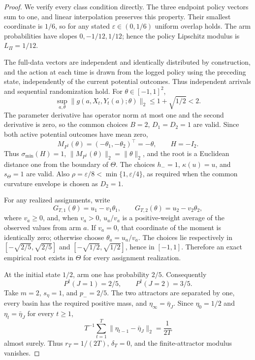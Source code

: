 \documentclass{article}
\begin{document}
\begin{proof}
We verify every class condition directly.  The three endpoint policy vectors sum to one, and linear interpolation preserves this property.  Their smallest coordinate is \(1/6\), so for any stated \(\varepsilon\in(0,1/6)\) uniform overlap holds.  The arm probabilities have slopes \(0,-1/12,1/12\); hence the policy Lipschitz modulus is \(L_\Pi=1/12\).

The full-data vectors are independent and identically distributed by construction, and the action at each time is drawn from the logged policy using the preceding state, independently of the current potential outcomes.  Thus independent arrivals and sequential randomization hold.  For \(\theta\in[-1,1]^2\),
\[
 \sup_{a,\theta}\|g(a,X_t,Y_t(a);\theta)\|_2
 \le1+\sqrt{1/2}<2.
\]
The parameter derivative has operator norm at most one and the second derivative is zero, so the common choices \(B=2\), \(D_1=D_2=1\) are valid.  Since both active potential outcomes have mean zero,
\[
 M_{P^\dagger}(\theta)
 =(-\theta_1,-\theta_2)^\top=-\theta,
 \qquad H=-I_2.                                                           \tag{33}
\]
Thus \(\sigma_{\min}(H)=1\), \(\|M_{P^\dagger}(\theta)\|_2=\|\theta\|_2\), and the root is a Euclidean distance one from the boundary of \(\Theta\).  The choices \(h_-=1\), \(\kappa(u)=u\), and \(s_\Theta=1\) are valid.  Also \(\rho=\varepsilon/8<\min\{1,\varepsilon/4\}\), as required when the common curvature envelope is chosen as \(D_2=1\).

For any realized assignments, write
\[
 G_{T,1}(\theta)=u_1-v_1\theta_1,
 \qquad
 G_{T,2}(\theta)=u_2-v_2\theta_2,
\]
where \(v_a\ge0\), and, when \(v_a>0\), \(u_a/v_a\) is a positive-weight average of the observed values from arm \(a\).  If \(v_a=0\), that coordinate of the moment is identically zero; otherwise choose \(\theta_a=u_a/v_a\).  The choices lie respectively in \([ -\sqrt{2/5},\sqrt{2/5} ]\) and \([ -\sqrt{1/2},\sqrt{1/2} ]\), hence in \([-1,1]\).  Therefore an exact empirical root exists in \(\Theta\) for every assignment realization.

At the initial state \(1/2\), arm one has probability \(2/5\).  Consequently
\[
 P^\dagger(J=1)=2/5,
 \qquad P^\dagger(J=2)=3/5.                                               \tag{34}
\]
Take \(m=2\), \(s_\eta=1\), and \(p_-=2/5\).  The two attractors are separated by one, every basin has the required positive mass, and \(\eta_\infty=\bar\eta_J\).  Since \(\eta_0=1/2\) and \(\eta_t=\bar\eta_J\) for every \(t\ge1\),
\[
 T^{-1}\sum_{t=1}^T\|\eta_{t-1}-\bar\eta_J\|_2=\frac1{2T}              \tag{35}
\]
almost surely.  Thus \(r_T=1/(2T)\), \(\delta_T=0\), and the finite-attractor modulus vanishes.


\end{proof}
\end{document}
